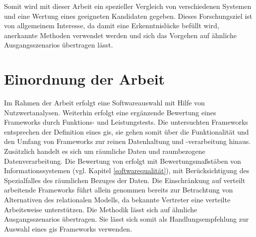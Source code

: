 Somit wird mit dieser Arbeit ein spezieller Vergleich von verschiedenen Systemen und eine Wertung eines geeigneten Kandidaten gegeben.
Dieses Forschungsziel ist von allgemeinem Interesse, da damit eine Erkenntnislücke befüllt wird, anerkannte Methoden verwendet werden und sich das Vorgehen auf ähnliche Ausgangsszenarios übertragen lässt.

\section{Einordnung der Arbeit}
Im Rahmen der Arbeit erfolgt eine Softwareauswahl mit Hilfe von Nutzwertanalysen.
Weiterhin erfolgt eine ergänzende Bewertung eines Frameworks durch Funktions- und Leistungstests.
Die untersuchten Frameworks entsprechen der Definition eines \Gls{gis}, sie gehen somit über die Funktionalität und den Umfang von Frameworks zur reinen Datenhaltung und -ver\-ar\-beitung hinaus.
Zusätzlich handelt es sich um räumliche Daten und raumbezogene Datenverarbeitung.
Die Bewertung von  erfolgt mit Bewertungsmaßstäben von Informationssystemen (vgl. Kapitel \ref{softwarequalität}), mit Berücksichtigung des Spezialfalles des räumlichen Bezuges der Daten.
Die Einschränkung auf verteilt arbeitende Frameworks führt allein genommen bereits zur Betrachtung von Alternativen des relationalen Modells, da bekannte Vertreter eine verteilte Arbeitsweise unterstützen.
Die Methodik lässt sich auf ähnliche Ausgangsszenarios übertragen.
Sie lässt sich somit als Handlungsempfehlung zur Auswahl eines \Gls{gis} Frameworks verwenden.

